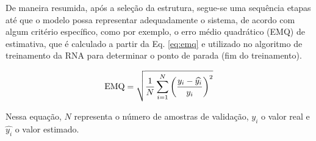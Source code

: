 
De maneira resumida, após a seleção da estrutura, segue-se uma sequência etapas
até que o modelo possa representar adequadamente o sistema, de acordo com algum
critério específico, como por exemplo, o erro médio quadrático (EMQ) de
estimativa, que é calculado a partir da Eq. \ref{eq:emq} e utilizado no
algoritmo de treinamento da RNA para determinar o ponto de parada (fim do
treinamento).


\begin{equation}\label{eq:emq}
\text{EMQ} = \sqrt{\frac{1}{N}
             \sum_{i=1}^{N}\left(\frac{y_i - \widehat{y_i}}{y_i}\right)^2}
\end{equation}

Nessa equação, $N$ representa o número de amostras de validação, $y_i$ o valor
real e $\widehat{y_i}$ o valor estimado.

